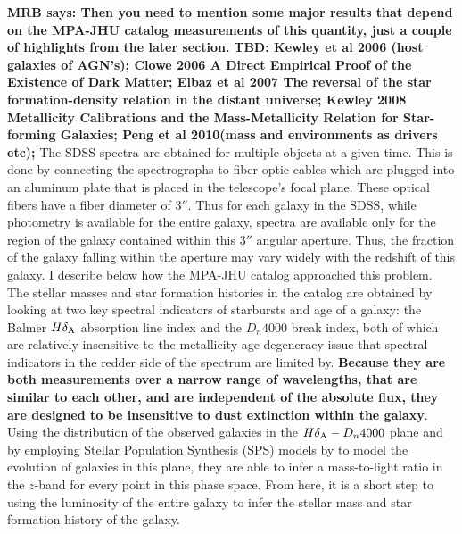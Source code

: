 {\bf MRB says: Then you need to mention some major results that depend
on the MPA-JHU catalog measurements of this quantity, just a couple of 
highlights from the later section. }{\bf TBD:  Kewley et al 2006 (host galaxies of AGN's); Clowe 2006 A Direct Empirical Proof of the Existence of Dark Matter; Elbaz et al 2007 The reversal of the star formation-density relation in the distant
universe; Kewley 2008 Metallicity Calibrations and the Mass-Metallicity Relation for Star-forming Galaxies; Peng et al 2010(mass and environments as drivers etc);}
The SDSS spectra are obtained for multiple objects at a given time. This is done by connecting the spectrographs to fiber optic cables which are plugged into an aluminum plate that is placed in the telescope's focal plane. These optical fibers have a fiber diameter of $3''$. Thus for each galaxy in the SDSS, while photometry is available for the entire galaxy, spectra are available only for the region of the galaxy contained within this $3''$ angular aperture. Thus, the fraction of the galaxy falling within the aperture may vary widely with the redshift of this galaxy. I describe below how the MPA-JHU catalog approached this problem.\\
The stellar masses and star formation histories in the catalog are obtained by looking at two key spectral indicators of starbursts and age of a galaxy: the Balmer $H\delta_{\rm A}$ absorption line index and the $D_{n}4000$ break index, both of which are relatively insensitive to the metallicity-age degeneracy issue that spectral indicators in the redder side of the spectrum are limited by. {\bf Because they are both measurements over a narrow range of wavelengths, that are similar to each other, and are independent of the absolute flux, they are designed to be insensitive to dust extinction within the galaxy}. Using the distribution of the observed galaxies in the $H\delta_{\rm A}-D_{n}4000$ plane and by employing Stellar Population Synthesis (SPS) models by \citet{bruzual_stellar_2003-1} to model the evolution of galaxies in this plane, they are able to infer a mass-to-light ratio in the $z$-band \citep{kauffmann_stellar_2003} for every point in this phase space. From here, it is a short step to using the luminosity of the entire galaxy to infer the stellar mass and star formation history of the galaxy.\\
